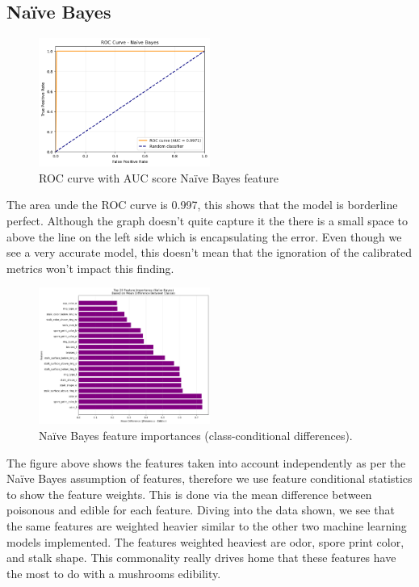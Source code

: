 \documentclass[conference]{IEEEtran}
\begin{document}
\subsection{Naïve Bayes}
\begin{figure}[!htbp]
\centering
\includegraphics[width=0.5\textwidth]{images/naiveBayesRoc.png}
\caption{ROC curve with AUC score Naïve Bayes feature}
\label{fig:nb_features}
\end{figure}
\FloatBarrier

The area unde the ROC curve is 0.997, this shows that the model is borderline perfect. Although the graph doesn't quite capture it the there is a small space to above the line on the left side which is encapsulating the error. Even though we see a very accurate model, this doesn't mean that the ignoration of the calibrated metrics won't impact this finding.

\begin{figure}[!htbp]
\centering
\includegraphics[width=0.5\textwidth]{images/naiveBayesFeatures.png}
\caption{Naïve Bayes feature importances (class-conditional differences).}
\label{fig:nb_features}
\end{figure}
\FloatBarrier

The figure above shows the features taken into account independently as per the Naïve Bayes assumption of features, therefore we use feature conditional statistics to show the feature weights. This is done via the mean difference between poisonous and edible for each feature. Diving into the data shown, we see that the same features are weighted heavier similar to the other two machine learning models implemented. The features weighted heaviest are odor, spore print color, and stalk shape. This commonality really drives home that these features have the most to do with a mushrooms edibility.
\end{document}
